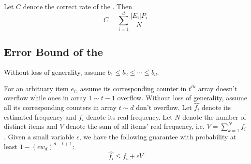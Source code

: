 \begin{thm}
Let $C$ denote the correct rate of the \ccm. Then
\begin{equation}
C=\sum_{i=1}^{d}\frac{|E_i|P_i}{N}
\end{equation}
\end{thm}

\presub
\subsection{Error Bound of the \ccm} \postsub

Without loss of generality, assume $b_1 \le b_2 \le \cdots \le b_d$. 
\begin{thm}
For an arbituary item $e_i$, assume its corresponding counter in $t^{th}$ array doesn't overflow while ones in array $1 \sim t-1$ overflow. 
Without loss of generality, assume all its corresponding counters in array $t \sim d$ don't overflow. 
Let $\hat{f_i}$ denote its estimated frequency and $f_i$ denote its real frequency. 
Let $N$ denote the number of distinct items and $V$ denote the sum of all items' real frequency, i.e. $V=\sum_{k=1}^{N}f_i$.
Given a small variable $\epsilon$, we have the following guarantee with probability at least $1-(\epsilon w_d) ^{d-t+1}$:
\begin{equation}
\hat{f_i} \le f_i + \epsilon V
\end{equation}
\end{thm}

